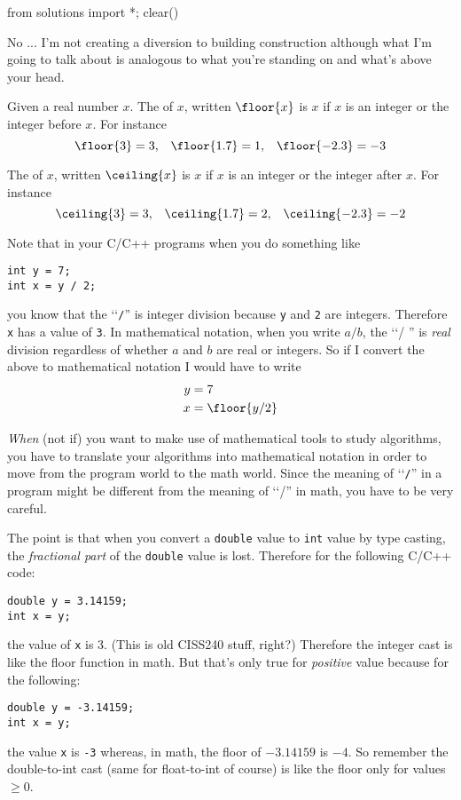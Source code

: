 \begin{python0}
from solutions import *; clear()
\end{python0}

No ... I'm not creating a diversion to building construction although
what I'm going to talk about is analogous to what you're standing on
and what's above your head.

Given a real number $x$.
The  of $x$, 
written $\floor{x}$ is $x$ if $x$ is an integer or the
integer before $x$.
For instance
\[
\floor{3} = 3, \,\,\,\,\, 
\floor{1.7} = 1, \,\,\,\,\, 
\floor{-2.3} = -3
\]

The  of $x$, written $\ceiling{x}$ is $x$ if
$x$ is an integer or the integer after $x$.
For instance
\[
\ceiling{3} = 3, \,\,\,\,\, 
\ceiling{1.7} = 2, \,\,\,\,\, 
\ceiling{-2.3} = -2
\]

Note that in your C/C++ programs when you do something like
\begin{Verbatim}[frame=single,fontsize=\footnotesize]
int y = 7;
int x = y / 2;
\end{Verbatim}
you know that the \lq\lq\verb!/!'' is integer division because
\verb!y! and \verb!2! are integers.
Therefore \verb!x! has a value of \verb!3!.
In mathematical notation, when you write $a/b$,
the \lq\lq / '' is \textit{real} division
regardless of whether $a$ and $b$ are real or integers.
So if I convert the above to mathematical notation
I would have to write
\begin{align*}
y &= 7 \\
x &= \floor{y/2}
\end{align*}

\textit{When} (not if) 
you want to make use of mathematical tools to study
algorithms, you have to translate your algorithms into mathematical notation
in order to move from the program world to the math world.
Since the meaning of \lq\lq \verb!/!'' in a program might be different from
the meaning of \lq\lq /'' in math, you have to be very careful.

The point is that when you convert a \verb!double! value
to \verb!int! value by type casting, 
the \textit{fractional part} of the \verb!double!
value is lost.
Therefore for the following C/C++ code:
\begin{Verbatim}[frame=single,fontsize=\footnotesize]
double y = 3.14159;
int x = y;
\end{Verbatim}
the value of \verb!x! is 3. 
(This is old CISS240 stuff, right?)
Therefore the integer cast is like the floor function in math.
But that's only true for \textit{positive} value because for the following:
\begin{Verbatim}[frame=single,fontsize=\footnotesize]
double y = -3.14159;
int x = y;
\end{Verbatim}
the value \verb!x! is \verb!-3! whereas, in math, 
the floor of $-3.14159$ is $-4$.
So remember the double-to-int cast (same for float-to-int of course)
is like the floor only for values $\geq 0$.


